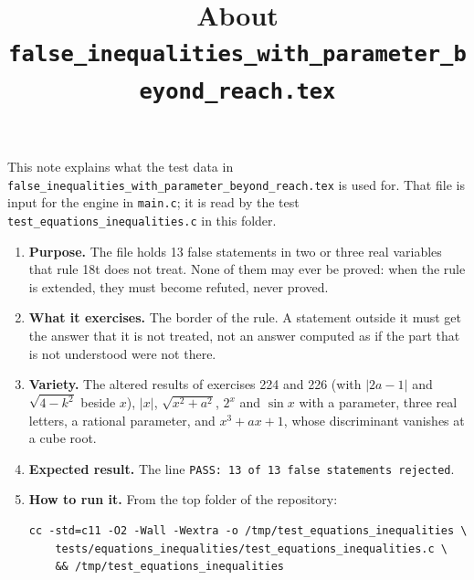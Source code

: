 \documentclass[11pt,a4paper]{article}
\title{About \texttt{false\_inequalities\_with\_parameter\_beyond\_reach.tex}}
\author{}
\date{}
\begin{document}
\maketitle
This note explains what the test data in \texttt{false\_inequalities\_with\_parameter\_beyond\_reach.tex} is used for. That file is input for the engine in \texttt{main.c}; it is read by the test \texttt{test\_equations\_inequalities.c} in this folder.

\begin{enumerate}
\item \textbf{Purpose.} The file holds 13 false statements in two or three real variables that rule 18t does not treat. None of them may ever be proved: when the rule is extended, they must become refuted, never proved.

\item \textbf{What it exercises.} The border of the rule. A statement outside it must get the answer that it is not treated, not an answer computed as if the part that is not understood were not there.

\item \textbf{Variety.} The altered results of exercises 224 and 226 (with $\left|2a - 1\right|$ and $\sqrt{4 - k^{2}}$ beside $x$), $\left|x\right|$, $\sqrt{x^{2} + a^{2}}$, $2^{x}$ and $\sin x$ with a parameter, three real letters, a rational parameter, and $x^{3} + ax + 1$, whose discriminant vanishes at a cube root.

\item \textbf{Expected result.} The line \texttt{PASS: 13 of 13 false statements rejected}.

\item \textbf{How to run it.} From the top folder of the repository:
\begin{verbatim}
cc -std=c11 -O2 -Wall -Wextra -o /tmp/test_equations_inequalities \
    tests/equations_inequalities/test_equations_inequalities.c \
    && /tmp/test_equations_inequalities
\end{verbatim}
\end{enumerate}
\end{document}
